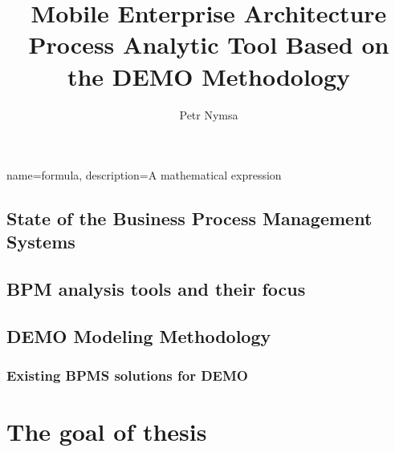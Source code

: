 \documentclass[thesis=B,english]{FITthesis}[2012/06/26]
\title{Mobile Enterprise Architecture Process Analytic Tool Based on the DEMO Methodology}
\author{Petr Nymsa} %
\begin{document}

{
        name=formula,
        description={A mathematical expression}
}




\begin{introduction}    
    \section{State of the Business Process Management Systems}
    
    \section{BPM analysis tools and their focus}
    
    \section{DEMO Modeling Methodology}  
    
    \subsection{Existing BPMS solutions for DEMO}
    
\end{introduction}

\chapter{The goal of thesis}
\end{document}
